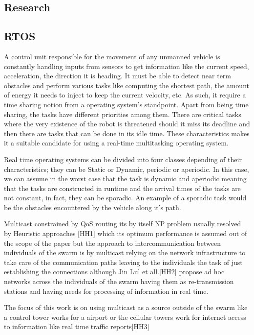 \documentclass[journal]{IEEEtran}
\begin{document}
\begin{itemize}
\section{Research}
\subsection{RTOS}
A control unit responsible for the movement of any unmanned vehicle is constantly handling inputs from sensors to get information like the current speed, acceleration, the direction it is heading. It must be able to detect near term obstacles and perform various tasks like computing the shortest path, the amount of energy it needs to inject to keep the current velocity, etc. As such, it require a time sharing notion from a operating system's standpoint. Apart from being time sharing, the tasks have different priorities among them. There are critical tasks where the very existence of the robot is threatened should it miss its deadline and then there are tasks that can be done in its idle time. These characteristics makes it a suitable candidate for using a real-time multitasking operating system.

Real time operating systems can be divided into four classes depending of their characteristics; they can be Static or Dynamic, periodic or aperiodic. In this case, we can assume in the worst case that the task is dynamic and aperiodic meaning that the tasks are constructed in runtime and the arrival times of the tasks are not constant, in fact, they can be sporadic. An example of a sporadic task would be the obstacles encountered by the vehicle along it's path.

Multicast constrained by QoS routing its by itself NP problem usually resolved by Heuristic approaches [HH1] which its optimum performance is assumed out of the scope of the paper but the approach to  intercommunication between individuals of the swarm is by multicast relying on the network infrastructure to take care of the communication paths leaving to the individuals the task of just establishing the connections although Jin Lul et all.[HH2] propose ad hoc networks across the individuals of the swarm having them as re-transmission stations and having needs for processing of information in real time.


The focus of this work is on using multicast as a source outside of the swarm like a control tower works for a airport or the cellular towers work for internet access to information like real time traffic reports[HH3]


\end{itemize}
\end{document}
